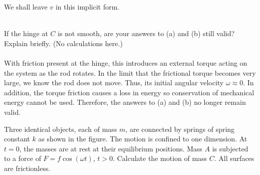 \documentclass[11pt,letterpaper]{article}
\begin{document}
			We shall leave $v$ in this implicit form.
			\\
			\\ 
			\item
			If the hinge at $C$ is not smooth, are your answers to (a) and (b) still valid? Explain briefly. (No calculations here.)
			\\
			\\
			With friction present at the hinge, this introduces an external torque acting on the system as the rod rotates. In the limit
			that the frictional torque becomes very large, we know the rod does not move. Thus, its initial angular velocity $\omega
			\approx 0$. In addition, the torque friction causes a loss in energy so conservation of mechanical energy cannot be used. 
			Therefore, the answers to (a) and (b) no longer remain valid. 
		\eenum
		
		\item Three identical objects, each of mass $m$, are connected by springs of spring constant $k$ as shown in the
		figure. The motion is confined to one dimension. At $t=0$, the masses are at rest at their equilibrium positions. Mass $A$
		is subjected to a force of $F = f\cos(\omega t)$, $t>0$. Calculate the motion of mass $C$. All surfaces are frictionless.
		
		
\end{document}
